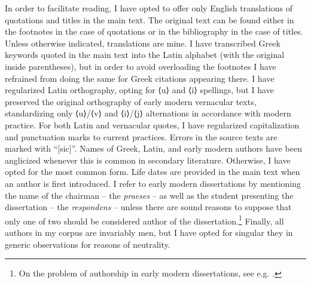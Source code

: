 \hypertarget{Toc19704800}{}
In order to facilitate reading, I have opted to offer only English translations of quotations and titles in the main text. The original text can be found either in the footnotes in the case of quotations or in the bibliography in the case of titles. Unless otherwise indicated, translations are mine. I have transcribed Greek keywords quoted in the main text into the Latin alphabet (with the original inside parentheses), but in order to avoid overloading the footnotes I have refrained from doing the same for Greek citations appearing there. I have regularized Latin orthography, opting for ⟨u⟩ and ⟨i⟩ spellings, but I have preserved the original orthography of early modern vernacular texts, standardizing only ⟨u⟩/⟨v⟩ and ⟨i⟩/⟨j⟩ alternations in accordance with modern practice. For both Latin and vernacular quotes, I have regularized capitalization and punctuation marks to current practices. Errors in the source texts are marked with “[sic]”. Names of Greek, Latin, and early modern authors have been anglicized whenever this is common in secondary literature. Otherwise, I have opted for the most common form. Life dates are provided in the main text when an author is first introduced. I refer to early modern dissertations by mentioning the name of the chairman – the \textit{praeses} – as well as the student presenting the dissertation – the \textit{respondens} – unless there are sound reasons to suppose that only one of two should be considered author of the dissertation.\footnote{On the problem of authorship in early modern dissertations, see e.g. \citet{Considine2008b}.} Finally, all authors in my corpus are invariably men, but I have opted for singular they in generic observations for reasons of neutrality.
